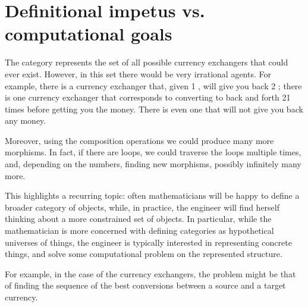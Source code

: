 



\section{Definitional impetus vs. computational goals  }

The category \Curr represents the set of all possible currency exchangers that could ever exist. However, in this set there would be very irrational agents.
For example, there is a currency exchanger that, given 1 \USD, will give you back 2 \USD; there is one currency exchanger that corresponds to converting \USD to \CHF back and forth 21 times before getting you the money. There is even one that will not give you back any money.

Moreover, using the composition operations we could produce many more morphisms. In fact, if there are loops, we could traverse the loops multiple times, and, depending on the numbers, finding new morphisms, possibly infinitely many more.

This highlights a recurring topic: often mathematicians will be happy to define a broader category of objects, while, in practice, the engineer will find herself thinking about a more constrained set of objects.
In particular, while the mathematician is more concerned with defining categories as hypothetical universes of things, the engineer is typically interested in representing concrete things, and solve some computational problem on the represented structure.

For example, in the case of the currency exchangers, the problem might be that of finding the sequence of the best conversions between a source and a target currency.

